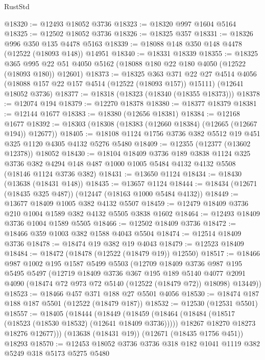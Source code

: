 \begin{lexlean}{RustStd}
\begin{coremodule}
@18320 := @12493 @18052 @3736
@18323 := @18320 @997 @1604 @5164
@18325 := @12502 @18052 @3736
@18326 := @18325 @357
@18331 := @18326 @996 @350 @135 @4478 @5163
@18339 := @18088 @148 @350 @148 @4478 (@12522 (@18093 @148)) @14951
@18340 := @18331 @18339
@18355 := @18325
    @365
    @995
    @22
    @51
    @4050
    @5162
    (@18088 @180 @22 @180 @4050 (@12522 (@18093 @180)) @12601)
@18373 := @18325
    @363
    @371
    @22
    @27
    @4514
    @4056
    (@18088 @157 @22 @157 @4514 (@12522 (@18093 @157)) @15111)
    (@12641 @18052 @3736)
@18377 := @18318 (@18323 (@18340 (@18355 @18373)))
@18378 := @12074 @194
@18379 := @12270 @18378
@18380 := @18377 @18379
@18381 := @12144 @1677
@18383 := @18380 (@12656 @18381)
@18384 := @12168 @1677
@18392 := @18303 (@18308 (@18383 (@12660 @18384) (@12665 (@12667 @194)) @12677))
@18405 := @18108 @1124 @1756 @3736 @382 @5512 @19 @451 @325 @1120 @4305 @4132 @5276 @5480
@18409 := @12355 (@12377 (@13602 @12378)) @18052
@18430 := @18104
    @18409
    @3736
    @189
    @3838
    @1124
    @325
    @3736
    @382
    @4294
    @148
    @487
    @1000
    @1005
    @5484
    @4132
    @4132
    @5508
    (@18146 @1124 @3736 @382)
@18431 := @13650 @1124
@18434 := @18430 (@13638 (@18431 @148))
@18435 := @13657 @1124
@18444 := @18434 (@12671 (@18435 @325 @487)) (@12447 (@18163 @1000 @5484 @4132))
@18449 := @13677 @18409 @1005 @382 @4132 @5507
@18459 := @12479 @18409 @3736 @210 @1004 @1589 @382 @4132 @5505 @3838 @1602
@18464 := @12493 @18409 @3736 @1004 @1589 @5505
@18466 := @12502 @18409 @3736
@18472 := @18466 @359 @1003 @382 @1588 @4043 @5504
@18474 := @12514 @18409 @3736
@18478 := @18474 @19 @382 @19 @4043
@18479 := @12523 @18409
@18484 := @18472 (@18478 (@12522 (@18479 @19)) @12550)
@18517 := @18466
    @987
    @1002
    @195
    @1587
    @5499
    @5503
    (@12709
      @18409
      @3736
      @987
      @195
      @5495
      @5497
      (@12719
        @18409
        @3736
        @367
        @195
        @189
        @5140
        @4077
        @2091
        @4090
        (@18474 @72 @973 @72 @5140 (@12522 (@18479 @72)) @18098)
        @13449))
@18523 := @18466 @457 @371 @188 @27 @5501 @4056
@18530 := @18474 @187 @188 @187 @5501 (@12522 (@18479 @187))
@18532 := @12530 (@12531 @5501)
@18557 := @18405
    (@18444
      (@18449
        (@18459
          (@18464 (@18484 (@18517 (@18523 (@18530 @18532) (@12641 @18409 @3736)))))
          @18267
          @18270
          @18273
          @18276
          @12677)))
    (@13638 (@18431 @19))
    (@12671 (@18435 @1756 @451))
    @18293
@18570 := @12453 @18052 @3736 @3736 @318 @182 @1041 @1119 @382 @5249 @318 @5173 @5275 @5480

\end{coremodule}
\end{lexlean}
